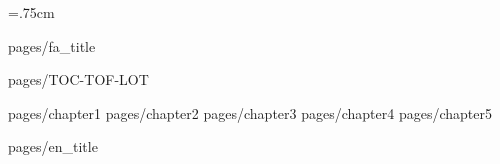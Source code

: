 \documentclass[
			   oneside,
			   phd,
			   12pt
			   ]{AUTthesis}
\begin{document}
	\baselineskip=.75cm
	\linespread{1.75}

	 {pages/fa_title}
	
	
	
	
	 {pages/TOC-TOF-LOT}
	
	
	\pagestyle{style1}
	
	 {pages/chapter1}
	 {pages/chapter2}
	 {pages/chapter3}
	 {pages/chapter4}
	 {pages/chapter5}
	

	\chapterfont{\vspace*{-2em}\centering\LARGE}%
	
	\appendix
	
	
	

	\parindent=0pt
	

	\pagestyle{style7}
	\printindex
	\pagestyle{style7}
	
	 {pages/en_title}
	
\end{document}
